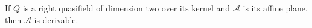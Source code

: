 If $Q$ is a right quasifield of dimension two over its kernel and $\mathcal{A}$ is its affine plane, then $\mathcal{A}$ is derivable.
